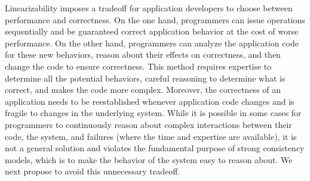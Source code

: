 
Linearizability imposes a tradeoff for application developers to choose between performance and correctness. On the one hand, programmers can issue operations sequentially and be guaranteed correct application behavior at the cost of worse performance. On the other hand, programmers can analyze the application code for these new behaviors, reason about their effects on correctness, and then change the code to ensure correctness. 
This method requires expertise to determine all the potential behaviors, careful reasoning to determine what is correct, and makes the code more complex. Moreover, the correctness of an application needs to be reestablished whenever application code changes and is fragile to changes in the underlying system. While it is possible in some cases for programmers to continuously reason about complex interactions between their code, the system, and failures (where the time and expertise are available), it is not a general solution and violates the fundamental purpose of strong consistency models, which is to make the behavior of the system easy to reason about. 
We next propose \mdl to avoid this unnecessary tradeoff.



